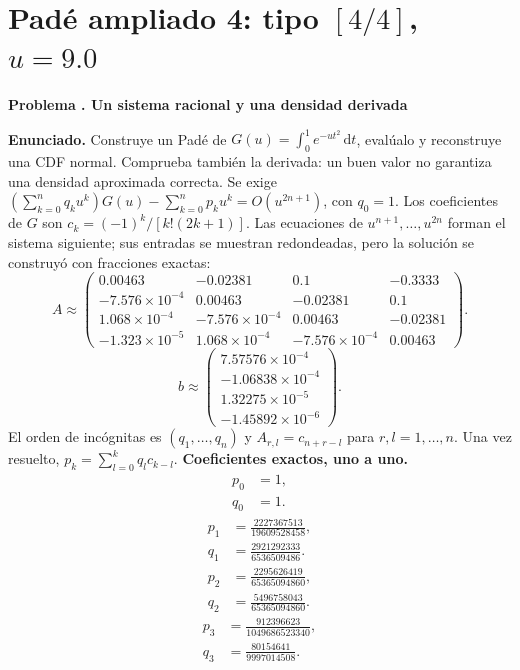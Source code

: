 \documentclass[11pt,a4paper]{article}
\newcommand{\dd}{\,\mathrm d}
\theoremstyle{definition}
\newcounter{problema}
\newenvironment{resuelto}[1]{\refstepcounter{problema}\par\medskip\Needspace{6\baselineskip}\textbf{Problema \theproblema. #1}\par}{\par\medskip}
\begin{document}
\section{\texorpdfstring{Padé ampliado 4: tipo $[4/4]$, $u=9.0$}{Padé ampliado 4: tipo [4/4], u=9.0}}
\begin{resuelto}{Un sistema racional y una densidad derivada}
\textbf{Enunciado.} Construye un Padé de $G(u)=\int_0^1e^{-ut^2}\dd t$, evalúalo y reconstruye una CDF normal. Comprueba también la derivada: un buen valor no garantiza una densidad aproximada correcta.
Se exige $(\sum_{k=0}^{n}q_ku^k)G(u)-\sum_{k=0}^{n}p_ku^k=O(u^{2n+1})$, con $q_0=1$. Los coeficientes de $G$ son $c_k=(-1)^k/[k!(2k+1)]$.
Las ecuaciones de $u^{n+1},\ldots,u^{2n}$ forman el sistema siguiente; sus entradas se muestran redondeadas, pero la solución se construyó con fracciones exactas:
{\small
\[
A\approx\begin{pmatrix}0.00463&-0.02381&0.1&-0.3333\\-7.576\times10^{-4}&0.00463&-0.02381&0.1\\1.068\times10^{-4}&-7.576\times10^{-4}&0.00463&-0.02381\\-1.323\times10^{-5}&1.068\times10^{-4}&-7.576\times10^{-4}&0.00463\end{pmatrix}.
\]
\[
b\approx\begin{pmatrix}7.57576\times10^{-4}\\-1.06838\times10^{-4}\\1.32275\times10^{-5}\\-1.45892\times10^{-6}\end{pmatrix}.
\]
}
El orden de incógnitas es $(q_1,\ldots,q_n)$ y $A_{r,l}=c_{n+r-l}$ para $r,l=1,\ldots,n$. Una vez resuelto, $p_k=\sum_{l=0}^{k}q_lc_{k-l}$.
\textbf{Coeficientes exactos, uno a uno.}
\[
\begin{aligned}p_0&=1,\\q_0&=1.\end{aligned}
\]
\[
\begin{aligned}p_1&=\frac{2227367513}{19609528458},\\q_1&=\frac{2921292333}{6536509486}.\end{aligned}
\]
\[
\begin{aligned}p_2&=\frac{2295626419}{65365094860},\\q_2&=\frac{5496758043}{65365094860}.\end{aligned}
\]
\[
\begin{aligned}p_3&=\frac{912396623}{1049686523340},\\q_3&=\frac{80154641}{9997014508}.\end{aligned}
\]
\end{resuelto}
\end{document}
